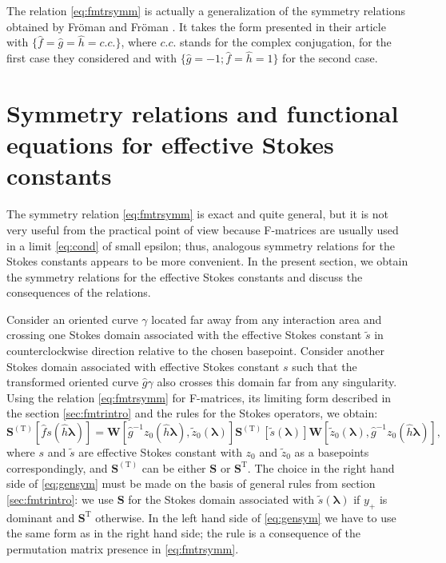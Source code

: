\documentclass[atmp]{ipart_v1}
\def\lmbd{\bm{\lambda}}
\def\f{\hat{f}}
\def\g{\hat{g}}
\def\h{\hat{h}}
\def\S{\bm{S}}
\def\W{\bm{W}}
\def\T{\mathrm{T}}
\def\unity{1}
\newcommand\eref[1]{\eqref{#1}}
\newcommand\sref[1]{section \ref{#1}}
\begin{document}
The relation \eref{eq:fmtrsymm} is actually a generalization of the symmetry relations obtained by
Fr\"oman and Fr\"oman \cite{frpaper}. It takes the form presented in their article
with $\{\f = \g = \h = c.c.\}$, where $c.c.$ stands for the complex conjugation, for the
first case they considered and with $\{\g = -\unity; \f = \h = \unity\}$ for the second case.
















\section{Symmetry relations and functional equations for effective Stokes constants \label{sec:scsymm}}

The symmetry relation \eref{eq:fmtrsymm} is exact and quite general, but it is not very useful
from the practical point of view because F-matrices are usually used in a limit \eref{eq:cond} of
small epsilon; thus, analogous symmetry relations for the Stokes constants appears to be more
convenient. In the present section, we obtain the symmetry relations for the effective Stokes constants 
and discuss the consequences of the relations.

Consider an oriented curve $\gamma$ located far away from any interaction area and crossing
one Stokes domain associated with the effective Stokes constant $\tilde{s}$ in counterclockwise direction 
relative to the chosen basepoint. Consider another Stokes domain associated with
effective Stokes constant $s$ such that the transformed oriented curve $\g\gamma$ also crosses this 
domain far from any singularity. 
Using the relation \eref{eq:fmtrsymm} for F-matrices, its limiting form described in the 
\sref{sec:fmtrintro} and the rules for the Stokes operators, we obtain:
\begin{equation}
\S^{(\T)} \left[ \f s(\h\lmbd) \right] = 
\W \left[ \g^{-1}z_0(\h\lmbd), \tilde{z}_0(\lmbd) \right]
\S^{(\T)} \left[ \tilde{s}(\lmbd) \right]
\W \left[ \tilde{z}_0(\lmbd), \g^{-1}z_0(\h\lmbd) \right],
\label{eq:gensym}
\end{equation}
where $s$ and $\tilde{s}$ are effective Stokes constant with $z_0$ and $\tilde{z}_0$ as a basepoints 
correspondingly, and $\S^{(\T)}$ can be either $\S$ or $\S^{\T}$. The choice in the right hand side 
of \eref{eq:gensym} must be made on the basis of general rules from \sref{sec:fmtrintro}: 
we use $\S$ for the Stokes domain associated with $\tilde{s}(\lmbd)$ if $y_+$ is dominant 
and $\S^{\T}$ otherwise. In the left hand side of \eref{eq:gensym} we have to use the 
same form as in the right hand side; the rule is a consequence of the permutation
matrix presence in \eref{eq:fmtrsymm}.
\end{document}
